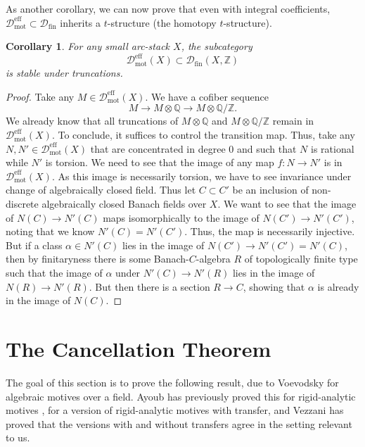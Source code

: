 \documentclass[11pt]{amsart}
\numberwithin{equation}{section}
\numberwithin{theorem}{section}
\newtheorem{corollary}[theorem]{Corollary}
\theoremstyle{definition}
\begin{document}
As another corollary, we can now prove that even with integral coefficients, $\mathcal D_{\mathrm{mot}}^{\mathrm{eff}}\subset \mathcal D_{\mathrm{fin}}$ inherits a $t$-structure (the homotopy $t$-structure).

\begin{corollary}\label{cor:homotopytstructure} For any small arc-stack $X$, the subcategory
\[
\mathcal D_{\mathrm{mot}}^{\mathrm{eff}}(X)\subset \mathcal D_{\mathrm{fin}}(X,\mathbb Z)
\]
is stable under truncations.
\end{corollary}

\begin{proof} Take any $M\in \mathcal D_{\mathrm{mot}}^{\mathrm{eff}}(X)$. We have a cofiber sequence
\[
M\to M\otimes \mathbb Q\to M\otimes \mathbb Q/\mathbb Z.
\]
We already know that all truncations of $M\otimes \mathbb Q$ and $M\otimes \mathbb Q/\mathbb Z$ remain in $\mathcal D_{\mathrm{mot}}^{\mathrm{eff}}(X)$. To conclude, it suffices to control the transition map. Thus, take any $N,N'\in \mathcal D_{\mathrm{mot}}^{\mathrm{eff}}(X)$ that are concentrated in degree $0$ and such that $N$ is rational while $N'$ is torsion. We need to see that the image of any map $f: N\to N'$ is in $\mathcal D_{\mathrm{mot}}^{\mathrm{eff}}(X)$. As this image is necessarily torsion, we have to see invariance under change of algebraically closed field. Thus let $C\subset C'$ be an inclusion of non-discrete algebraically closed Banach fields over $X$. We want to see that the image of $N(C)\to N'(C)$ maps isomorphically to the image of $N(C')\to N'(C')$, noting that we know $N'(C)=N'(C')$. Thus, the map is necessarily injective. But if a class $\alpha\in N'(C)$ lies in the image of $N(C')\to N'(C')=N'(C)$, then by finitaryness there is some Banach-$C$-algebra $R$ of topologically finite type such that the image of $\alpha$ under $N'(C)\to N'(R)$ lies in the image of $N(R)\to N'(R)$. But then there is a section $R\to C$, showing that $\alpha$ is already in the image of $N(C)$.
\end{proof}


\section{The Cancellation Theorem}
 
The goal of this section is to prove the following result, due to Voevodsky \cite{VoevodskyCancellation} for algebraic motives over a field. Ayoub has previously proved this for rigid-analytic motives \cite{AyoubRigid}, for a version of rigid-analytic motives with transfer, and Vezzani \cite{VezzaniTransfer} has proved that the versions with and without transfers agree in the setting relevant to us.
\end{document}
